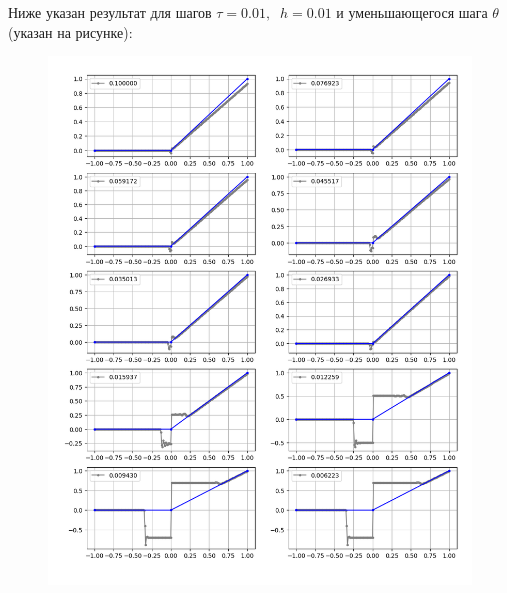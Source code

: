 \documentclass[a4paper,12pt]{article}
\begin{document}
Ниже указан результат для шагов $\tau=0.01, \;\; h=0.01$  и уменьшающегося шага $\theta$ (указан на рисунке):
\begin{figure}[h]
    \begin{center}
    \begin{minipage}[h]{0.85\linewidth}
    \includegraphics[width=1\linewidth]{Figure_11.png}
    \end{minipage}
    \end{center}
\end{figure}
\end{document}
